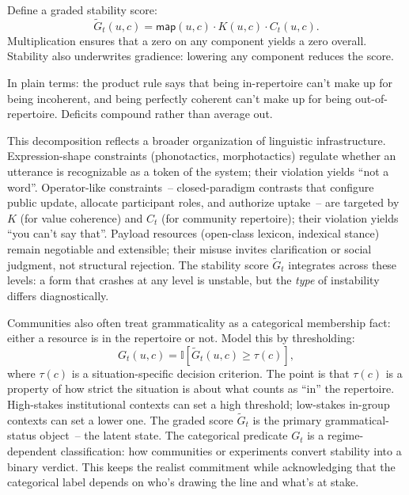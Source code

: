 \documentclass[12pt,letterpaper]{article}
\begin{document}
Define a graded stability score:
\begin{equation}\label{eq:stability}
\widetilde{G}_t(u,c)=\mathsf{map}(u,c)\cdot K(u,c)\cdot C_t(u,c).
\end{equation}
Multiplication ensures that a zero on any component yields a zero overall. Stability also underwrites gradience: lowering any component reduces the score.

In plain terms: the product rule says that being in-repertoire can't make up for being incoherent, and being perfectly coherent can't make up for being out-of-repertoire. Deficits compound rather than average out.

This decomposition reflects a broader organization of linguistic infrastructure. Expression-shape constraints (phonotactics, morphotactics) regulate whether an utterance is recognizable as a token of the system; their violation yields \enquote{not a word}. Operator-like constraints~-- closed-paradigm contrasts that configure public update, allocate participant roles, and authorize uptake~-- are targeted by $K$ (for value coherence) and $C_t$ (for community repertoire); their violation yields \enquote{you can't say that}. Payload resources (open-class lexicon, indexical stance) remain negotiable and extensible; their misuse invites clarification or social judgment, not structural rejection. The stability score $\widetilde{G}_t$ integrates across these levels: a form that crashes at any level is unstable, but the \emph{type} of instability differs diagnostically.

Communities also often treat grammaticality as a categorical membership fact: either a resource is in the repertoire or not. Model this by thresholding:
\begin{equation}\label{eq:membership}
G_t(u,c)=\mathbb{I}\!\left[\widetilde{G}_t(u,c)\ge \tau(c)\right],
\end{equation}
where $\tau(c)$ is a situation-specific decision criterion. The point is that $\tau(c)$ is a property of how strict the situation is about what counts as \enquote{in} the repertoire. High-stakes institutional contexts can set a high threshold; low-stakes in-group contexts can set a lower one. The graded score $\widetilde{G}_t$ is the primary grammatical-status object~-- the latent state. The categorical predicate $G_t$ is a regime-dependent classification: how communities or experiments convert stability into a binary verdict. This keeps the realist commitment while acknowledging that the categorical label depends on who's drawing the line and what's at stake.
\end{document}
